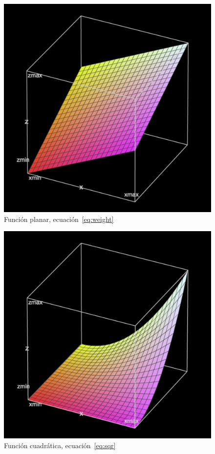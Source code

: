 \documentclass{ci5652}
\begin{document}
\begin{figure}[p]
    \centering
    \includegraphics[width=0.8\linewidth]{weighted-3b}
    \caption{Función planar, ecuación~\ref{eq:weight}}
    \label{fig:weighted3}
\end{figure}

\begin{figure}[p]
    \centering
    \includegraphics[width=0.8\linewidth]{squared-3b}
    \caption{Función cuadrática, ecuación~\ref{eq:sqr}}
    \label{fig:squared3}
\end{figure}
\end{document}
